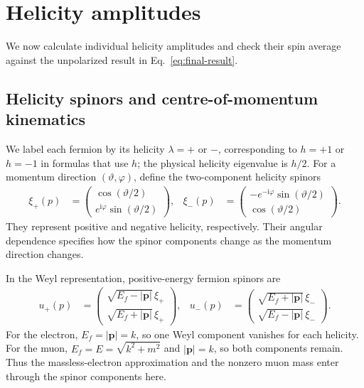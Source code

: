 \documentclass[12pt,a4paper]{article}
\numberwithin{equation}{section}
\newcommand{\ii}{\mathrm i}
\begin{document}
\section{Helicity amplitudes}
\label{sec:helicity}
We now calculate individual helicity amplitudes and check their spin average against the unpolarized result in Eq.~\eqref{eq:final-result}.

\subsection{Helicity spinors and centre-of-momentum kinematics}
We label each fermion by its helicity $\lambda=+$ or $-$, corresponding to
$h=+1$ or $h=-1$ in formulas that use $h$; the physical helicity eigenvalue
is $h/2$. For a momentum direction $(\vartheta,\varphi)$, define the
 two-component helicity spinors
\begin{align}
 \xi_+(p)&=\begin{pmatrix}\cos(\vartheta/2)\\
 e^{\ii\varphi}\sin(\vartheta/2)\end{pmatrix},&
 \xi_-(p)&=\begin{pmatrix}-e^{-\ii\varphi}\sin(\vartheta/2)\\
 \cos(\vartheta/2)\end{pmatrix}.
 \label{eq:xi}
\end{align}
They represent positive and negative helicity, respectively. Their angular
dependence specifies how the spinor components change as the momentum
direction changes.

In the Weyl representation, positive-energy fermion spinors are
\begin{align}
 u_+(p)&=\begin{pmatrix}\sqrt{E_f-|\bm p|}\,\xi_+\\
                       \sqrt{E_f+|\bm p|}\,\xi_+\end{pmatrix},&
 u_-(p)&=\begin{pmatrix}\sqrt{E_f+|\bm p|}\,\xi_-\\
                       \sqrt{E_f-|\bm p|}\,\xi_-\end{pmatrix}.
 \label{eq:helicity-spinors}
\end{align}
For the electron, $E_f=|\bm p|=k$, so one Weyl component vanishes for each
helicity. For the muon, $E_f=E=\sqrt{k^2+m^2}$ and $|\bm p|=k$, so both
components remain. Thus the massless-electron approximation and the nonzero
muon mass enter through the spinor components here.
\end{document}
